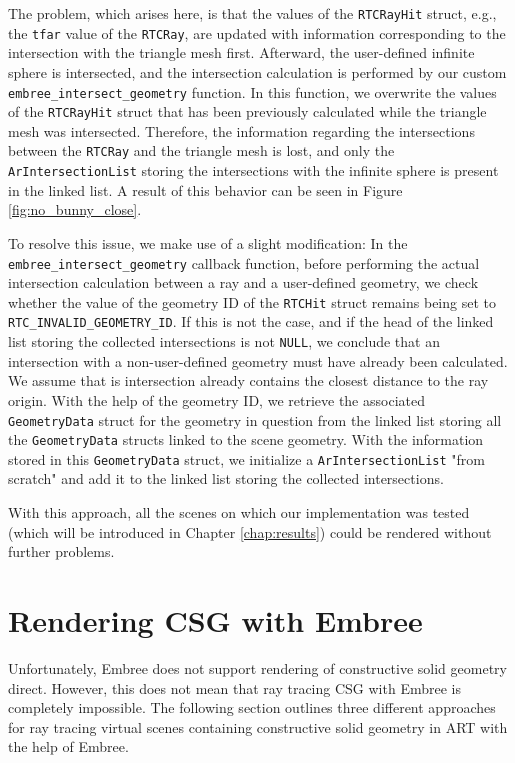 The problem, which arises here, is that the values of the \texttt{RTCRayHit} struct, e.g., the \texttt{tfar} value of the \texttt{RTCRay}, are updated with information corresponding to the intersection with the triangle mesh first. Afterward, the user-defined infinite sphere is intersected, and the intersection calculation is performed by our custom \texttt{embree\_intersect\_geometry} function. In this function, we overwrite the values of the \texttt{RTCRayHit} struct that has been previously calculated while the triangle mesh was intersected. Therefore, the information regarding the intersections between the \texttt{RTCRay} and the triangle mesh is lost, and only the \texttt{ArIntersectionList} storing the intersections with the infinite sphere is present in the linked list. A result of this behavior can be seen in Figure \ref{fig:no_bunny_close}.

To resolve this issue, we make use of a slight modification: In the  \texttt{embree\_intersect\_geometry} callback function, before performing the actual intersection calculation between a ray and a user-defined geometry, we check whether the value of the geometry ID of the \texttt{RTCHit} struct remains being set to \texttt{RTC\_INVALID\_GEOMETRY\_ID}. If this is not the case, and if the head of the linked list storing the collected intersections is not \texttt{NULL}, we conclude that an intersection with a non-user-defined geometry must have already been calculated. We assume that is intersection already contains the closest distance to the ray origin. With the help of the geometry ID, we retrieve the associated \texttt{GeometryData} struct for the geometry in question from the linked list storing all the \texttt{GeometryData} structs linked to the scene geometry. With the information stored in this \texttt{GeometryData} struct, we initialize a \texttt{ArIntersectionList} "from scratch" and add it to the linked list storing the collected intersections.

With this approach, all the scenes on which our implementation was tested (which will be introduced in Chapter \ref{chap:results}) could be rendered without further problems.


\section{Rendering CSG with Embree}
\label{sec:embree_csg}

Unfortunately, Embree does not support rendering of constructive solid geometry direct. However, this does not mean that ray tracing CSG with Embree is completely impossible. The following section outlines three different approaches for ray tracing virtual scenes containing constructive solid geometry in ART with the help of Embree.

